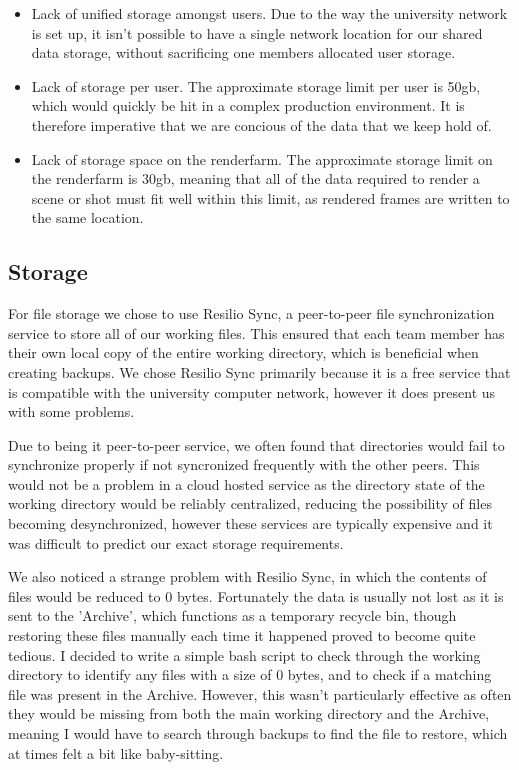 \documentclass[11pt]{article}
\begin{document}
\begin{itemize}

\item Lack of unified storage amongst users. Due to the way the university network is set up, it isn't possible to have a single network location for our shared data storage, without sacrificing one members allocated user storage.

\item Lack of storage per user. The approximate storage limit per user is 50gb, which would quickly be hit in a complex production environment. It is therefore imperative that we are concious of the data that we keep hold of.

\item Lack of storage space on the renderfarm. The approximate storage limit on the renderfarm is 30gb, meaning that all of the data required to render a scene or shot must fit well within this limit, as rendered frames are written to the same location.

\end{itemize}

\subsection{Storage}

For file storage we chose to use Resilio Sync, a peer-to-peer file synchronization service
to store all of our working files. This ensured that each team member has their own local copy of the entire working directory, which is beneficial when creating backups. We chose Resilio Sync primarily because it is a free service that is compatible with the university computer network, however it does present us with some problems.

Due to being it peer-to-peer service, we often found that directories would fail to synchronize properly if not syncronized frequently with the other peers. This would not be a problem in a cloud hosted service as the directory state of the working directory would be reliably centralized, reducing the possibility of files becoming desynchronized, however these services are typically expensive and it was difficult to predict our exact storage requirements.

We also noticed a strange problem with Resilio Sync, in which the contents of files would be reduced to 0 bytes. Fortunately the data is usually not lost as it is sent to the 'Archive', which functions as a temporary recycle bin, though restoring these files manually each time it happened proved to become quite tedious. I decided to write a simple bash script to check through the working directory to identify any files with a size of 0 bytes, and to check if a matching file was present in the Archive. However, this wasn't particularly effective as often they would be missing from both the main working directory and the Archive, meaning I would have to search through backups to find the file to restore, which at times felt a bit like baby-sitting.
\end{document}
